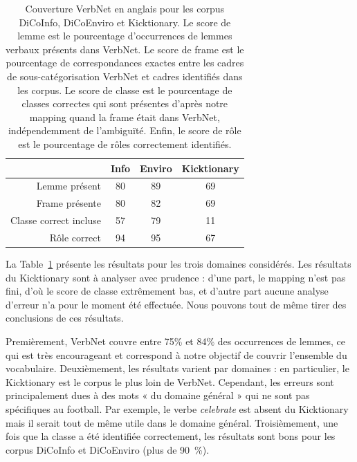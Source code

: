 \begin{table}[h]
\centering
\begin{tabular}{rccc}
  \toprule
         & Info & Enviro & Kicktionary \\
  \midrule
  Lemme présent          & 80 & 89 & 69 \\
  Frame présente         & 80 & 82 & 69 \\
  Classe correct incluse & 57 & 79 & 11 \\
  Rôle correct           & 94 & 95 & 67 \\
  \bottomrule
\end{tabular}

\caption{\label{table:coverage} Couverture VerbNet en anglais pour les corpus
    DiCoInfo, DiCoEnviro et Kicktionary. Le score de lemme est le pourcentage
    d'occurrences de lemmes verbaux présents dans VerbNet. Le score de frame
    est le pourcentage de correspondances exactes entre les cadres de
    sous-catégorisation VerbNet et cadres identifiés dans les corpus. Le score
    de classe est le pourcentage de classes correctes qui sont présentes
    d'après notre mapping quand la frame était dans VerbNet, indépendemment de
l'ambiguïté. Enfin, le score de rôle est le pourcentage de rôles correctement
identifiés.}

\end{table}

La Table~\ref{table:coverage} présente les résultats pour les trois domaines
considérés. Les résultats du Kicktionary sont à analyser avec prudence : d'une
part, le mapping n'est pas fini, d'où le score de classe extrêmement bas, et
d'autre part aucune analyse d'erreur n'a pour le moment été effectuée. Nous
pouvons tout de même tirer des conclusions de ces résultats.

Premièrement, VerbNet couvre entre 75\% et 84\% des occurrences de lemmes, ce
qui est très encourageant et correspond à notre objectif de couvrir l'ensemble
du vocabulaire.
Deuxièmement, les résultats varient par domaines : en particulier, le
Kicktionary est le corpus le plus loin de VerbNet. Cependant, les erreurs sont
principalement dues à des mots « du domaine général » qui ne sont pas
spécifiques au football. Par exemple, le verbe \textit{celebrate} est absent du
Kicktionary mais il serait tout de même utile dans le domaine général.
Troisièmement, une fois que la classe a été identifiée correctement, les
résultats sont bons pour les corpus DiCoInfo et DiCoEnviro (plus de 90~\%).

